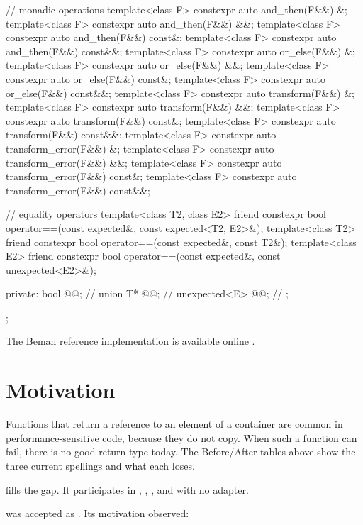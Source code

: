 \documentclass[a4paper,10pt,oneside,openany,final,article]{memoir}
\begin{document}
\begin{codeblock}
{{    // monadic operations
    template<class F>
    constexpr auto and_then(F&&) &;
    template<class F>
    constexpr auto and_then(F&&) &&;
    template<class F>
    constexpr auto and_then(F&&) const&;
    template<class F>
    constexpr auto and_then(F&&) const&&;
    template<class F>
    constexpr auto or_else(F&&) &;
    template<class F>
    constexpr auto or_else(F&&) &&;
    template<class F>
    constexpr auto or_else(F&&) const&;
    template<class F>
    constexpr auto or_else(F&&) const&&;
    template<class F>
    constexpr auto transform(F&&) &;
    template<class F>
    constexpr auto transform(F&&) &&;
    template<class F>
    constexpr auto transform(F&&) const&;
    template<class F>
    constexpr auto transform(F&&) const&&;
    template<class F>
    constexpr auto transform_error(F&&) &;
    template<class F>
    constexpr auto transform_error(F&&) &&;
    template<class F>
    constexpr auto transform_error(F&&) const&;
    template<class F>
    constexpr auto transform_error(F&&) const&&;

    // equality operators
    template<class T2, class E2>
    friend constexpr bool operator==(const expected&, const expected<T2, E2>&);
    template<class T2>
    friend constexpr bool operator==(const expected&, const T2&);
    template<class E2>
    friend constexpr bool operator==(const expected&, const unexpected<E2>&);

  private:
    bool @@;   // \expos
    union {
        T* @@;     // \expos
        unexpected<E> @@; // \expos
    };
};
}
\end{codeblock}

The Beman reference implementation is available online
\cite{Downey_beman_expected}.

\chapter{Motivation}

Functions that return a reference to an element of a container are common in
performance-sensitive code, because they do not copy. When such a
function can fail, there is no good return type today. The Before/After tables
above show the three current spellings and what each loses.

 fills the gap. It participates in ,
, , and  with no
adapter.

 was accepted as \cite{P2988R12}. Its motivation
observed:
\end{document}
